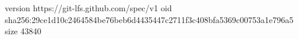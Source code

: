 version https://git-lfs.github.com/spec/v1
oid sha256:29ce1d10c2464584be76beb6d4435447c2711f3c408bfa5369c00753a1e796a5
size 43840
